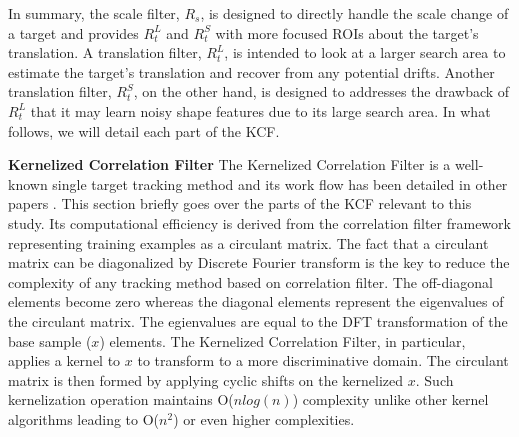 \documentclass[10pt,twocolumn,letterpaper]{article}
\begin{document}
In summary, the scale filter, $R_{s}$, is designed to directly handle
the scale change of a target and provides $R_{t}^{L}$ and $R_{t}^{S}$
with more focused ROIs about the target's translation. A translation
filter, $R_{t}^{L}$, is intended to look at a larger search area to
estimate the target's translation and recover from any potential
drifts. Another translation filter, $R_{t}^{S}$, on the other hand, is
designed to addresses the drawback of $R_{t}^{L}$ that it may learn
noisy shape features due to its large search area. In what follows, we
will detail each part of the KCF.

\textbf{Kernelized Correlation Filter} The Kernelized Correlation
Filter is a well-known single target tracking method and its work
flow has been detailed in other papers
\cite{henriques2012exploiting,henriques2015high}. This section briefly
goes over the parts of the KCF relevant to this study. Its
computational efficiency is derived from the correlation filter
framework representing training examples as a circulant matrix. The
fact that a circulant matrix can be diagonalized by Discrete Fourier
transform is the key to reduce the complexity of any tracking method
based on correlation filter. The off-diagonal elements become zero
whereas the diagonal elements represent the eigenvalues of the
circulant matrix. The egienvalues are equal to the DFT transformation
of the base sample ($x$) elements. The Kernelized Correlation Filter,
in particular, applies a kernel to $x$ to transform to a more
discriminative domain. The circulant matrix is then formed by applying
cyclic shifts on the kernelized $x$. Such kernelization operation
maintains O($nlog(n)$) complexity unlike other kernel algorithms
leading to O($n^{2}$) or even higher complexities.
\end{document}
